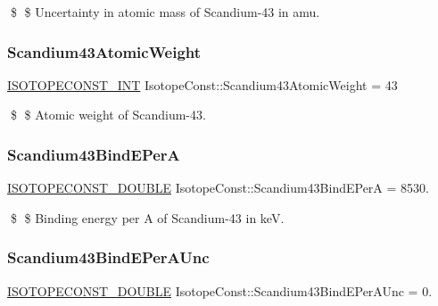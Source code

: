 \$ \$ Uncertainty in atomic mass of Scandium-\/43 in amu. \mbox{\label{group___isotope_const-_scandium-_sc43_ga634a9aad13794cb03002ecea10498ceb}} 
\subsubsection{\texorpdfstring{Scandium43\+Atomic\+Weight}{Scandium43AtomicWeight}}
{\footnotesize\ttfamily \mbox{\hyperlink{group___isotope_const-_macros_ga5f18360b3e99483a35c32d789e62621c}{I\+S\+O\+T\+O\+P\+E\+C\+O\+N\+S\+T\+\_\+\+I\+NT}} Isotope\+Const\+::\+Scandium43\+Atomic\+Weight = 43}

\$ \$ Atomic weight of Scandium-\/43. \mbox{\label{group___isotope_const-_scandium-_sc43_ga494c942a1faf548e272c47cb4bc4f01b}} 
\subsubsection{\texorpdfstring{Scandium43\+Bind\+E\+PerA}{Scandium43BindEPerA}}
{\footnotesize\ttfamily \mbox{\hyperlink{group___isotope_const-_macros_ga8f45a7272ce02c0b4c65c44636ed719a}{I\+S\+O\+T\+O\+P\+E\+C\+O\+N\+S\+T\+\_\+\+D\+O\+U\+B\+LE}} Isotope\+Const\+::\+Scandium43\+Bind\+E\+PerA = 8530.}

\$ \$ Binding energy per A of Scandium-\/43 in keV. \mbox{\label{group___isotope_const-_scandium-_sc43_gad0220bff38af76125d32a15f9409633f}} 
\subsubsection{\texorpdfstring{Scandium43\+Bind\+E\+Per\+A\+Unc}{Scandium43BindEPerAUnc}}
{\footnotesize\ttfamily \mbox{\hyperlink{group___isotope_const-_macros_ga8f45a7272ce02c0b4c65c44636ed719a}{I\+S\+O\+T\+O\+P\+E\+C\+O\+N\+S\+T\+\_\+\+D\+O\+U\+B\+LE}} Isotope\+Const\+::\+Scandium43\+Bind\+E\+Per\+A\+Unc = 0.}

